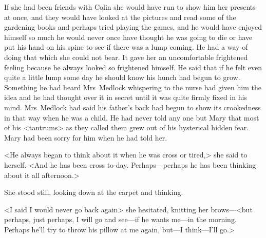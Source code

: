 If she had been friends with Colin she would have run to show him her presents at once, and they would have looked at the pictures and read some of the gardening books and perhaps tried playing the games, and he would have enjoyed himself so much he would never once have thought he was going to die or have put his hand on his spine to see if there was a lump coming. He had a way of doing that which she could not bear. It gave her an uncomfortable frightened feeling because he always looked so frightened himself. He said that if he felt even quite a little lump some day he should know his hunch had begun to grow. Something he had heard Mrs~Medlock whispering to the nurse had given him the idea and he had thought over it in secret until it was quite firmly fixed in his mind. Mrs~Medlock had said his father's back had begun to show its crookedness in that way when he was a child. He had never told any one but Mary that most of his <tantrums> as they called them grew out of his hysterical hidden fear. Mary had been sorry for him when he had told her.

<He always began to think about it when he was cross or tired,> she said to herself. <And he has been cross to-day. Perhaps—perhaps he has been thinking about it all afternoon.>

She stood still, looking down at the carpet and thinking.

<I said I would never go back again\longdash> she hesitated, knitting her brows—<but perhaps, just perhaps, I will go and see—if he wants me—in the morning. Perhaps he'll try to throw his pillow at me again, but—I think—I'll go.>

